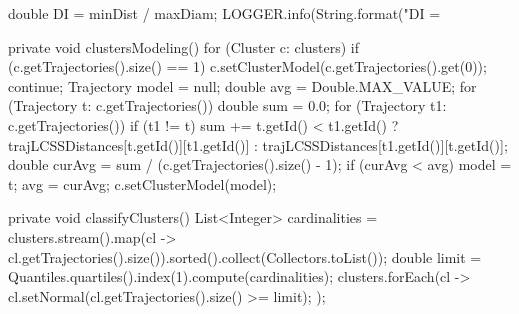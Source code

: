 {{		double DI = minDist / maxDiam;
		LOGGER.info(String.format("DI = %
	}

	private void clustersModeling() {
		for (Cluster c: clusters) {
			if (c.getTrajectories().size() == 1) {
				c.setClusterModel(c.getTrajectories().get(0));
				continue;
			}
			Trajectory model = null;
			double avg = Double.MAX_VALUE;
			for (Trajectory t: c.getTrajectories()) {
				double sum = 0.0;
				for (Trajectory t1: c.getTrajectories()) {
					if (t1 != t)
						sum += t.getId() < t1.getId() ? trajLCSSDistances[t.getId()][t1.getId()] : trajLCSSDistances[t1.getId()][t.getId()];
				}
				double curAvg = sum / (c.getTrajectories().size() - 1);
				if (curAvg < avg) {
					model = t;
					avg = curAvg;
				}
			}
			c.setClusterModel(model);
		}
	}

	private void classifyClusters() {
		List<Integer> cardinalities = clusters.stream().map(cl -> 	cl.getTrajectories().size()).sorted().collect(Collectors.toList());
		double limit = Quantiles.quartiles().index(1).compute(cardinalities);
		clusters.forEach(cl -> {
			cl.setNormal(cl.getTrajectories().size() >= limit);
		});
	}

}

